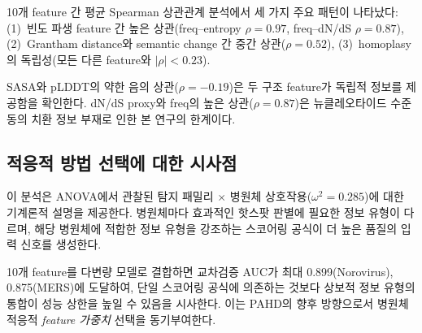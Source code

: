10개 feature 간 평균 Spearman 상관관계 분석에서 세 가지 주요 패턴이 나타났다:
(1)~빈도 파생 feature 간 높은 상관(freq--entropy $\rho = 0.97$, freq--dN/dS $\rho = 0.87$),
(2)~Grantham distance와 semantic change 간 중간 상관($\rho = 0.52$),
(3)~homoplasy의 독립성(모든 다른 feature와 $|\rho| < 0.23$).

SASA와 pLDDT의 약한 음의 상관($\rho = -0.19$)은 두 구조 feature가 독립적 정보를 제공함을 확인한다. dN/dS proxy와 freq의 높은 상관($\rho = 0.87$)은 뉴클레오타이드 수준 동의 치환 정보 부재로 인한 본 연구의 한계이다.

\subsection{적응적 방법 선택에 대한 시사점}

이 분석은 ANOVA에서 관찰된 탐지 패밀리 $\times$ 병원체 상호작용($\omega^2 = 0.285$)에 대한 기계론적 설명을 제공한다. 병원체마다 효과적인 핫스팟 판별에 필요한 정보 유형이 다르며, 해당 병원체에 적합한 정보 유형을 강조하는 스코어링 공식이 더 높은 품질의 입력 신호를 생성한다.

10개 feature를 다변량 모델로 결합하면 교차검증 AUC가 최대 0.899(Norovirus), 0.875(MERS)에 도달하여, 단일 스코어링 공식에 의존하는 것보다 상보적 정보 유형의 통합이 성능 상한을 높일 수 있음을 시사한다. 이는 PAHD의 향후 방향으로서 병원체 적응적 \textit{feature 가중치} 선택을 동기부여한다.

